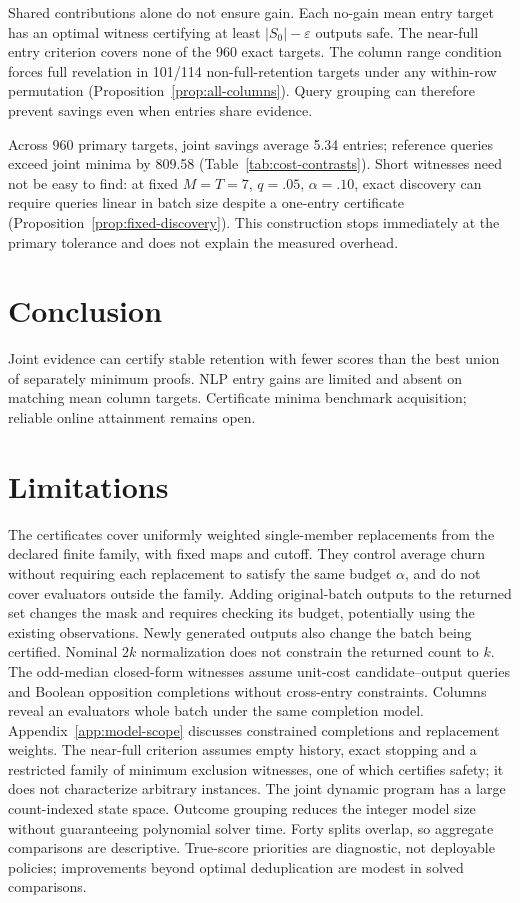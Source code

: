 \documentclass[11pt]{article}
\begin{document}
Shared contributions alone do not ensure gain. Each no-gain mean entry target has an optimal witness certifying at least $|S_0|-\varepsilon$ outputs safe. The near-full entry criterion covers none of the 960 exact targets. The column range condition forces full revelation in 101/114 non-full-retention targets under any within-row permutation (Proposition~\ref{prop:all-columns}). Query grouping can therefore prevent savings even when entries share evidence.

Across 960 primary targets, joint savings average 5.34 entries; reference queries exceed joint minima by 809.58 (Table~\ref{tab:cost-contrasts}). Short witnesses need not be easy to find: at fixed $M=T=7$, $q=.05$, $\alpha=.10$, exact discovery can require queries linear in batch size despite a one-entry certificate (Proposition~\ref{prop:fixed-discovery}). This construction stops immediately at the primary tolerance and does not explain the measured overhead.
\FloatBarrier
\section{Conclusion}
Joint evidence can certify stable retention with fewer scores than the best union of separately minimum proofs. NLP entry gains are limited and absent on matching mean column targets. Certificate minima benchmark acquisition; reliable online attainment remains open.

\section*{Limitations}
The certificates cover uniformly weighted single-member replacements from the declared finite family, with fixed maps and cutoff. They control average churn without requiring each replacement to satisfy the same budget $\alpha$, and do not cover evaluators outside the family. Adding original-batch outputs to the returned set changes the mask and requires checking its budget, potentially using the existing observations. Newly generated outputs also change the batch being certified. Nominal $2k$ normalization does not constrain the returned count to $k$. The odd-median closed-form witnesses assume unit-cost candidate--output queries and Boolean opposition completions without cross-entry constraints. Columns reveal an evaluator\textquotesingle s whole batch under the same completion model. Appendix~\ref{app:model-scope} discusses constrained completions and replacement weights. The near-full criterion assumes empty history, exact stopping and a restricted family of minimum exclusion witnesses, one of which certifies safety; it does not characterize arbitrary instances. The joint dynamic program has a large count-indexed state space. Outcome grouping reduces the integer model size without guaranteeing polynomial solver time. Forty splits overlap, so aggregate comparisons are descriptive. True-score priorities are diagnostic, not deployable policies; improvements beyond optimal deduplication are modest in solved comparisons.
\end{document}
